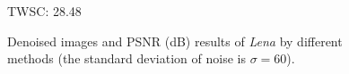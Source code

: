 \begin{figure}
\begin{adjustwidth}{-2cm}{}
{\begin{minipage}[t]{0.19\textwidth}
{\footnotesize TWSC: 28.48}
\end{minipage}
}
\caption{Denoised images and PSNR (dB) results of \textsl{Lena} by different methods (the standard deviation of noise is $\sigma=60$).}
    \label{fig5-4}
\end{adjustwidth}
\end{figure}

\begin{figure}
\begin{adjustwidth}{-2cm}{}
    \centering
{}
\end{adjustwidth}
\end{figure}
